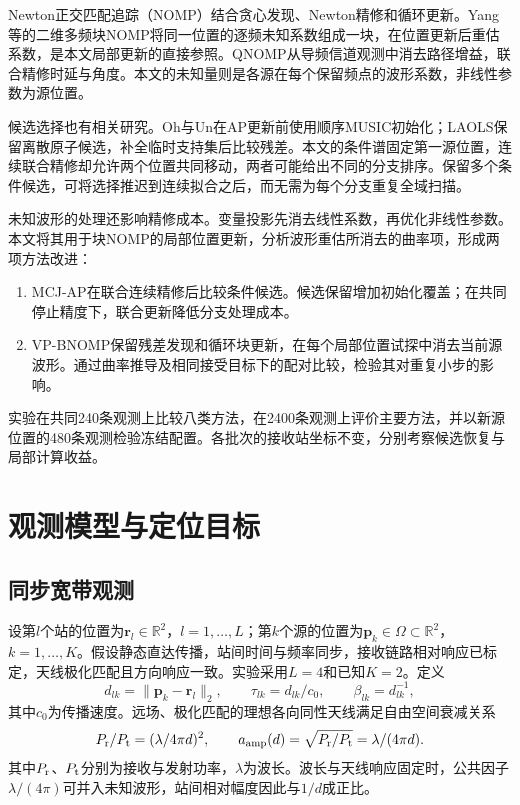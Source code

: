 \documentclass[a4paper,fleqn]{cas-sc}
\newcommand{\R}{\mathbb R}
\begin{document}
Newton正交匹配追踪（NOMP）结合贪心发现、Newton精修和循环更新\cite{Mamandipoor2016}。Yang等的二维多频块NOMP将同一位置的逐频未知系数组成一块，在位置更新后重估系数\cite{Yang2022}，是本文局部更新的直接参照。QNOMP从导频信道观测中消去路径增益，联合精修时延与角度\cite{Zeng2025}。本文的未知量则是各源在每个保留频点的波形系数，非线性参数为源位置。

候选选择也有相关研究。Oh与Un在AP更新前使用顺序MUSIC初始化\cite{OhUn1991}；LAOLS保留离散原子候选，补全临时支持集后比较残差\cite{Chatterjee2012}。本文的条件谱固定第一源位置，连续联合精修却允许两个位置共同移动，两者可能给出不同的分支排序。保留多个条件候选，可将选择推迟到连续拟合之后，而无需为每个分支重复全域扫描。

未知波形的处理还影响精修成本。变量投影先消去线性系数，再优化非线性参数\cite{GolubPereyra1973}。本文将其用于块NOMP的局部位置更新，分析波形重估所消去的曲率项，形成两项方法改进：
\begin{enumerate}
\item MCJ-AP在联合连续精修后比较条件候选。候选保留增加初始化覆盖；在共同停止精度下，联合更新降低分支处理成本。
\item VP-BNOMP保留残差发现和循环块更新，在每个局部位置试探中消去当前源波形。通过曲率推导及相同接受目标下的配对比较，检验其对重复小步的影响。
\end{enumerate}
实验在共同240条观测上比较八类方法，在2400条观测上评价主要方法，并以新源位置的480条观测检验冻结配置。各批次的接收站坐标不变，分别考察候选恢复与局部计算收益。

\FloatBarrier
\section{观测模型与定位目标}
\FloatBarrier
\subsection{同步宽带观测}
设第$l$个站的位置为$\bm r_l\in\R^2$，$l=1,\ldots,L$；第$k$个源的位置为$\bm p_k\in\Omega\subset\R^2$，$k=1,\ldots,K$。假设静态直达传播，站间时间与频率同步，接收链路相对响应已标定，天线极化匹配且方向响应一致。实验采用$L=4$和已知$K=2$。定义
\begin{equation}
d_{lk}=\|\bm p_k-\bm r_l\|_2,\qquad
\tau_{lk}=d_{lk}/c_0,\qquad \beta_{lk}=d_{lk}^{-1},
\label{en:distance}
\end{equation}
其中$c_0$为传播速度。远场、极化匹配的理想各向同性天线满足自由空间衰减关系
\begin{equation}
P_{\rm r}/P_{\rm t}=(\lambda/4\pi d)^2,\qquad
a_{\rm amp}(d)=\sqrt{P_{\rm r}/P_{\rm t}}=\lambda/(4\pi d).
\label{en:freespace}
\end{equation}
其中$P_{\rm r}$、$P_{\rm t}$分别为接收与发射功率，$\lambda$为波长\cite{ITURP5252024}。波长与天线响应固定时，公共因子$\lambda/(4\pi)$可并入未知波形，站间相对幅度因此与$1/d$成正比。
\end{document}
